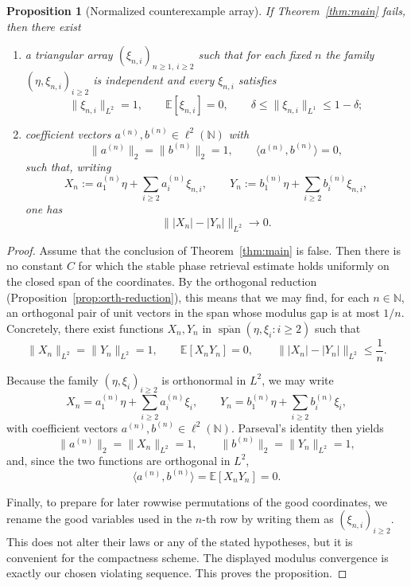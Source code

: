 \documentclass[11pt]{amsart}
\numberwithin{equation}{section}
\newtheorem{proposition}[theorem]{Proposition}
\theoremstyle{definition}
\theoremstyle{remark}
\newcommand{\E}{\mathbb E}
\newcommand{\N}{\mathbb N}
\newcommand{\Span}{\operatorname{span}}
\newcommand{\abs}[1]{\lvert #1 \rvert}
\newcommand{\norm}[1]{\lVert #1 \rVert}
\newcommand{\ip}[2]{\langle #1,#2\rangle}
\begin{document}
\begin{proposition}[Normalized counterexample array]\label{prop:counterexample}
If Theorem~\ref{thm:main} fails, then there exist
\begin{enumerate}[label=\rm(\roman*)]
\item a triangular array $(\xi_{n,i})_{n\ge1,\ i\ge2}$ such that for each
fixed $n$ the family $(\eta,\xi_{n,i})_{i\ge2}$ is independent and every
$\xi_{n,i}$ satisfies
\[
\norm{\xi_{n,i}}_{L^2}=1,
\qquad
\E[\xi_{n,i}]=0,
\qquad
\delta\le \norm{\xi_{n,i}}_{L^1}\le 1-\delta;
\]
\item coefficient vectors $a^{(n)},b^{(n)}\in \ell^2(\N)$ with
\[
\norm{a^{(n)}}_2=\norm{b^{(n)}}_2=1,
\qquad
\ip{a^{(n)}}{b^{(n)}}=0,
\]
such that, writing
\[
X_n:=a_1^{(n)}\eta+\sum_{i\ge2} a_i^{(n)}\xi_{n,i},
\qquad
Y_n:=b_1^{(n)}\eta+\sum_{i\ge2} b_i^{(n)}\xi_{n,i},
\]
one has
\[
\norm{\abs{X_n}-\abs{Y_n}}_{L^2}\longrightarrow0.
\]
\end{enumerate}
\end{proposition}

\begin{proof}
Assume that the conclusion of Theorem~\ref{thm:main} is false.  Then there is
no constant $C$ for which the stable phase retrieval estimate holds uniformly
on the closed span of the coordinates.  By the orthogonal reduction
(Proposition~\ref{prop:orth-reduction}), this means that we may find, for each
$n\in\N$, an orthogonal pair of unit vectors in the span whose modulus gap is
at most $1/n$.  Concretely, there exist functions $X_n,Y_n$ in
$\overline{\Span}(\eta,\xi_i:i\ge2)$ such that
\[
\norm{X_n}_{L^2}=\norm{Y_n}_{L^2}=1,
\qquad
\E[X_nY_n]=0,
\qquad
\norm{|X_n|-|Y_n|}_{L^2}\le \frac1n.
\]

Because the family $(\eta,\xi_i)_{i\ge2}$ is orthonormal in $L^2$, we may write
\[
X_n=a_1^{(n)}\eta+\sum_{i\ge2}a_i^{(n)}\xi_i,
\qquad
Y_n=b_1^{(n)}\eta+\sum_{i\ge2}b_i^{(n)}\xi_i,
\]
with coefficient vectors $a^{(n)},b^{(n)}\in\ell^2(\N)$.  Parseval's identity
then yields
\[
\norm{a^{(n)}}_2=\norm{X_n}_{L^2}=1,
\qquad
\norm{b^{(n)}}_2=\norm{Y_n}_{L^2}=1,
\]
and, since the two functions are orthogonal in $L^2$,
\[
\ip{a^{(n)}}{b^{(n)}}=\E[X_nY_n]=0.
\]

Finally, to prepare for later rowwise permutations of the good coordinates, we
rename the good variables used in the $n$-th row by writing them as
$(\xi_{n,i})_{i\ge2}$.  This does not alter their laws or any of the stated
hypotheses, but it is convenient for the compactness scheme.  The displayed
modulus convergence is exactly our chosen violating sequence.  This proves the
proposition.
\end{proof}
\end{document}
